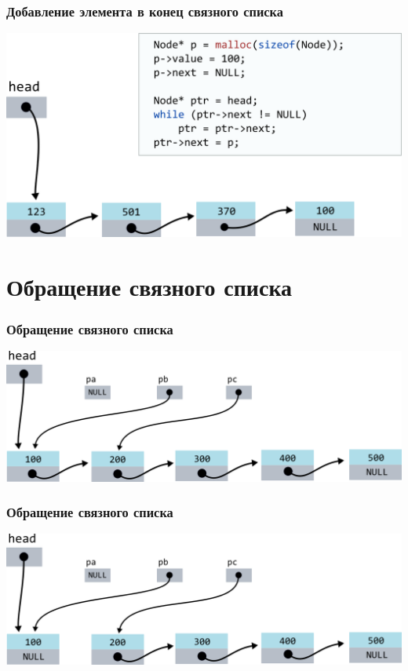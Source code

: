 \documentclass[10pt,pdf,hyperref={unicode}]{beamer}
\begin{document}
\begin{frame}[fragile]
\frametitle{Добавление элемента в конец связного списка}
\begin{center}
\includegraphics[width=\imageSizeMult\linewidth]{../images/codelist/codelistf_insert12.png}
\end{center}
\end{frame}


\section{Обращение связного списка}

\begin{frame}[fragile]
\frametitle{Обращение связного списка}
\begin{center}
\includegraphics[width=\imageSizeMult\linewidth]{../images/reverse_list/reverse_list1.png}
\end{center}
\end{frame}

\begin{frame}[fragile]
\frametitle{Обращение связного списка}
\begin{center}
\includegraphics[width=\imageSizeMult\linewidth]{../images/reverse_list/reverse_list2.png}
\end{center}
\end{frame}
\end{document}
